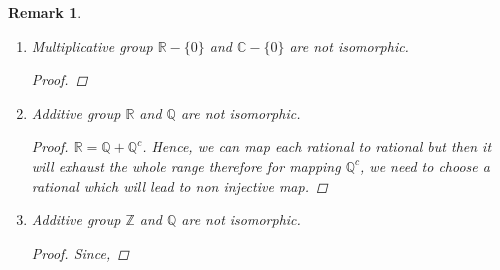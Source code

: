 \documentclass[12pt]{report}
\newtheorem*{rem}{Remark}
\begin{document}
\begin{rem}
    \begin{enumerate}
        \item Multiplicative group $\mathbb{R}-\{0\}$ and $\mathbb{C} - \{0\}$ are not isomorphic.
        \begin{proof}

        \end{proof}
        \item Additive group $\mathbb{R}$ and $\mathbb{Q}$ are not isomorphic.
        \begin{proof}
            $\mathbb{R} = \mathbb{Q} + \mathbb{Q}^c$. Hence, we can map each rational to rational but then it will exhaust the whole range therefore for mapping $\mathbb{Q}^c$, we need to choose a rational which will lead to non injective map.
        \end{proof}
        \item Additive group $\mathbb{Z}$ and $\mathbb{Q}$ are not isomorphic.
        \begin{proof}
            Since, 
        \end{proof}
    \end{enumerate}
\end{rem}
\end{document}
